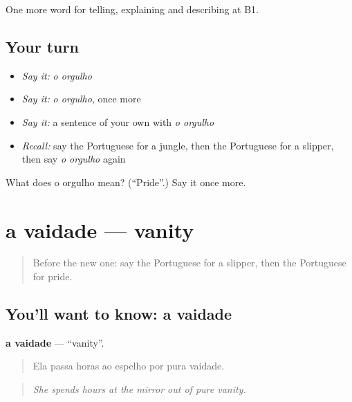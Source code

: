 \begin{grammarlens}[title={What you've built}]
One more word for telling, explaining and describing at B1.
\end{grammarlens}

\subsection*{Your turn}
\begin{itemize}
\raggedright
  \item \emph{Say it:} \emph{o orgulho}
  \item \emph{Say it:} \emph{o orgulho}, once more
  \item \emph{Say it:} a sentence of your own with \emph{o orgulho}
  \item \emph{Recall:} say the Portuguese for a jungle, then the Portuguese for a slipper, then say \emph{o orgulho} again
\end{itemize}

\begin{tcolorbox}[breakable,colback=teal!4,colframe=teal!35!black,title={Before you move on}]
What does o orgulho mean? (\textquotedblleft{}Pride\textquotedblright{}.) Say it once more.
\end{tcolorbox}
\section[a vaidade]{a vaidade — vanity}

\label{lesson:PT-C467-vaidade}



\begin{quote}
Before the new one: say the Portuguese for a slipper, then the Portuguese for pride.
\end{quote}

\subsection*{You'll want to know: a vaidade}
\textbf{a vaidade} — \textquotedblleft{}vanity\textquotedblright{}.

\begin{quote}
Ela passa horas ao espelho por pura vaidade.
\end{quote}

\begin{quote}
\emph{She spends hours at the mirror out of pure vanity.}
\end{quote}

